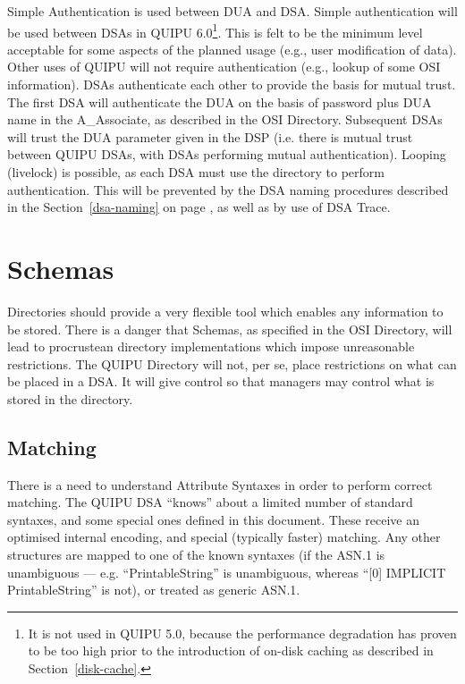 Simple Authentication is used between DUA and DSA.
Simple authentication will be used between DSAs in QUIPU 6.0\footnote{It is
not used in QUIPU 5.0, because the performance degradation has proven to be
too high prior to the introduction of on-disk caching as described in
Section~\ref{disk-cache}.}.
This is felt to be the minimum level acceptable for some aspects of
the planned usage (e.g., user modification of data).
Other uses of QUIPU will not require authentication (e.g., lookup of
some OSI information).
DSAs authenticate each other to provide the basis
for mutual trust.  
The first DSA will authenticate the DUA on the basis of password plus
DUA name in the A\_Associate, as described in the OSI Directory.
Subsequent DSAs will trust the DUA parameter given in the DSP (i.e.
there is mutual trust between QUIPU DSAs, with DSAs performing mutual
authentication).
Looping (livelock) is possible, as each DSA must use the directory to
perform authentication.   
This will be prevented by the DSA naming procedures described in the
Section~\ref{dsa-naming} on page \pageref{dsa-naming}, as well as by use of
DSA Trace.

\section {Schemas}

Directories should provide a very flexible tool
which enables any information to be stored.  There is a danger that Schemas,
as specified in the OSI Directory, will lead to procrustean directory implementations
which impose unreasonable restrictions.  The QUIPU Directory will not, per
se, place restrictions on what can be placed in a DSA.
It will give control so that managers may control what is stored in the
directory.

\subsection {Matching}

There is a need to understand Attribute Syntaxes in order to perform correct
matching.
The QUIPU DSA ``knows'' about a limited number of standard
syntaxes, and some  special ones defined in this document.
These receive an optimised internal encoding, and special (typically
faster) matching.
Any other structures are mapped to one of the known syntaxes (if the ASN.1 is
unambiguous --- e.g. ``PrintableString'' is unambiguous, whereas ``[0] IMPLICIT
PrintableString'' is not), or treated as generic ASN.1.

